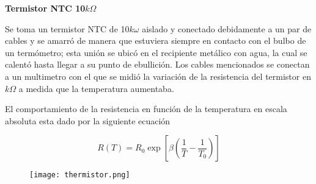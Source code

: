 \documentclass{article}
\begin{document}
\textbf{Termistor NTC 10$k\Omega$}

Se toma un termistor NTC de 10$k\omega$ aislado y conectado debidamente a un par de cables y se amarró de manera que estuviera siempre en contacto con el bulbo de un termómetro; esta unión se ubicó en el recipiente metálico con agua, la cual se calentó hasta llegar a su punto de ebullición. Los cables mencionados se conectan a un multimetro con el que se midió la variación de la resistencia del termistor en $k\Omega$ a medida que la temperatura aumentaba.

El comportamiento de la resistencia en función de la temperatura en escala absoluta esta dado por la siguiente ecuación

\[R(T)=R_0 \exp{\left[\beta\left(\frac{1}{T}-\frac{1}{T_0}\right)\right]}\]
\begin{figure}
\begin{center}
\texttt{[image: thermistor.png]}
\end{center}
\end{figure}
\end{document}
